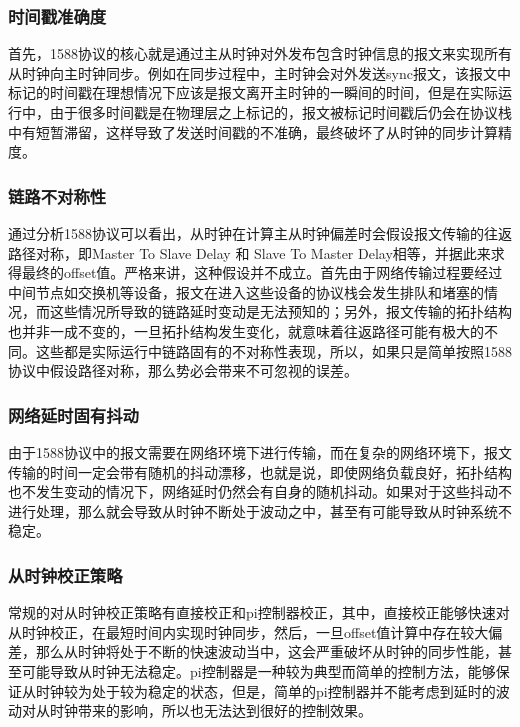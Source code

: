 \subsubsection{时间戳准确度}
\label{sec:1588_problem_timestamp_accu}
首先，1588协议的核心就是通过主从时钟对外发布包含时钟信息的报文来实现所有从时钟向主时钟同步。例如在同步过程中，主时钟会对外发送sync报文，该报文中标记的时间戳在理想情况下应该是报文离开主时钟的一瞬间的时间，但是在实际运行中，由于很多时间戳是在物理层之上标记的，报文被标记时间戳后仍会在协议栈中有短暂滞留，这样导致了发送时间戳的不准确，最终破坏了从时钟的同步计算精度。

\subsubsection{链路不对称性}
\label{sec:1588_problem_route_time_delay}
通过分析1588协议可以看出，从时钟在计算主从时钟偏差时会假设报文传输的往返路径对称，即Master To Slave Delay 和 Slave To Master Delay相等，并据此来求得最终的offset值。严格来讲，这种假设并不成立。首先由于网络传输过程要经过中间节点如交换机等设备，报文在进入这些设备的协议栈会发生排队和堵塞的情况，而这些情况所导致的链路延时变动是无法预知的；另外，报文传输的拓扑结构也并非一成不变的，一旦拓扑结构发生变化，就意味着往返路径可能有极大的不同。这些都是实际运行中链路固有的不对称性表现，所以，如果只是简单按照1588协议中假设路径对称，那么势必会带来不可忽视的误差。

\subsubsection{网络延时固有抖动}
\label{sec:1588_problem_route_time_delay}
由于1588协议中的报文需要在网络环境下进行传输，而在复杂的网络环境下，报文传输的时间一定会带有随机的抖动漂移，也就是说，即使网络负载良好，拓扑结构也不发生变动的情况下，网络延时仍然会有自身的随机抖动。如果对于这些抖动不进行处理，那么就会导致从时钟不断处于波动之中，甚至有可能导致从时钟系统不稳定。

\subsubsection{从时钟校正策略}
\label{sec:1588_problem_slave_clock_control}
常规的对从时钟校正策略有直接校正和pi控制器校正，其中，直接校正能够快速对从时钟校正，在最短时间内实现时钟同步，然后，一旦offset值计算中存在较大偏差，那么从时钟将处于不断的快速波动当中，这会严重破坏从时钟的同步性能，甚至可能导致从时钟无法稳定。pi控制器是一种较为典型而简单的控制方法，能够保证从时钟较为处于较为稳定的状态，但是，简单的pi控制器并不能考虑到延时的波动对从时钟带来的影响，所以也无法达到很好的控制效果。


